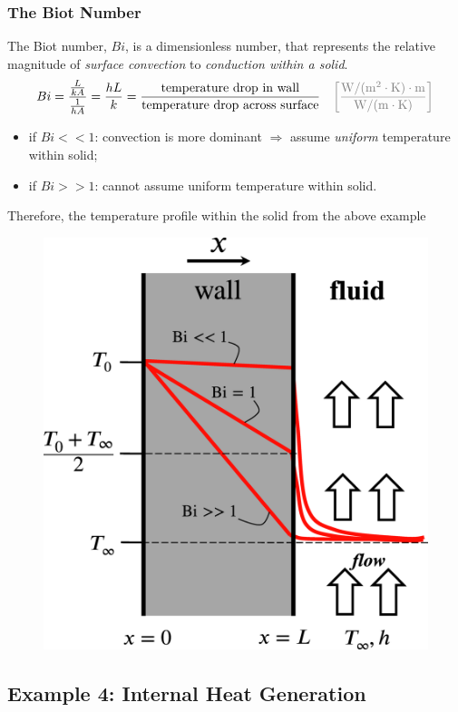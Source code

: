 \documentclass[12pt, a4paper]{article}
\begin{document}
\subsubsection{The Biot Number}
The Biot number, $Bi$, is a dimensionless number, that represents the relative magnitude of \textit{surface convection} to \textit{conduction within a solid}.
\[ 
    Bi = \frac{\frac{L}{kA}}{\frac{1}{hA}} = \frac{hL}{k} = \frac{\text{temperature drop in wall}}{\text{temperature drop across surface}}   \quad \mathrm{{\color{gray} \bigg[ \frac{ W/(m^2\cdot K) \cdot m}{W/(m\cdot K)}\bigg]}}
\]
\begin{itemize}
    \item if $Bi<<1$: convection is more dominant $\Rightarrow$ assume \textit{uniform} temperature within solid;
    \item if $Bi>>1$: cannot assume uniform temperature within solid.
\end{itemize}
Therefore, the temperature profile within the solid from the above example
\begin{figure}[H]
    \centering
    \includegraphics[width=.4\textwidth]{img/conduction_convection_solution.eps}
\end{figure}


\subsection{Example 4: Internal Heat Generation}
\end{document}
